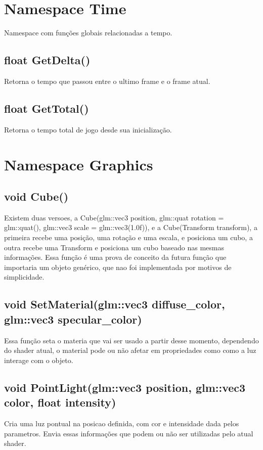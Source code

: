 \section{Namespace Time}
\label{doc:time}
Namespace com funções globais relacionadas a tempo.

\subsection{float GetDelta()}
Retorna o tempo que passou entre o ultimo frame e o frame atual.

\subsection{float GetTotal()}
Retorna o tempo total de jogo desde sua inicialização.

\section{Namespace Graphics}
\label{doc:graphics}

\subsection{void Cube()}
Existem duas versoes, a Cube(glm::vec3 position, glm::quat rotation = glm::quat(), glm::vec3 scale = glm::vec3(1.0f)), e a Cube(Transform transform), a primeira recebe uma posição, uma rotação e uma escala, e posiciona um cubo, a outra recebe uma Transform e posiciona um cubo baseado nas mesmas informações. Essa função é uma prova de conceito da futura função que importaria um objeto genérico, que nao foi implementada por motivos de simplicidade.

\subsection{void SetMaterial(glm::vec3 diffuse_color, glm::vec3 specular_color)}
Essa função seta o materia que vai ser usado a partir desse momento, dependendo do shader atual, o material pode ou não afetar em propriedades como como a luz interage com o objeto.

\subsection{void PointLight(glm::vec3 position, glm::vec3 color, float intensity)}
Cria uma luz pontual na posicao definida, com cor e intensidade dada pelos parametros. Envia essas informações que podem ou não ser utilizadas pelo atual shader.

